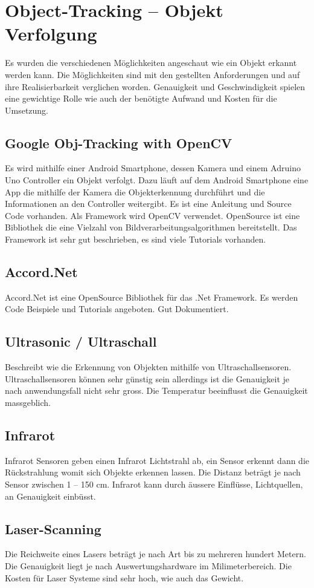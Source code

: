 \section{Object-Tracking – Objekt Verfolgung}
Es wurden die verschiedenen Möglichkeiten angeschaut wie ein Objekt erkannt werden kann. Die Möglichkeiten sind mit den gestellten Anforderungen und auf ihre Realisierbarkeit verglichen worden. Genauigkeit und Geschwindigkeit spielen eine gewichtige Rolle wie auch der benötigte Aufwand und Kosten für die Umsetzung.

\subsection{Google Obj-Tracking with OpenCV}
Es wird mithilfe einer Android Smartphone, dessen Kamera und einem Adruino Uno Controller ein Objekt verfolgt. Dazu läuft auf dem Android Smartphone eine App die mithilfe der Kamera die Objekterkennung durchführt und die Informationen an den Controller weitergibt. Es ist eine Anleitung und Source Code vorhanden. Als Framework wird OpenCV verwendet. OpenSource ist eine Bibliothek die eine Vielzahl von Bildverarbeitungsalgorithmen bereitstellt. Das Framework ist sehr gut beschrieben, es sind viele Tutorials vorhanden.

\subsection{Accord.Net}
Accord.Net ist eine OpenSource Bibliothek für das .Net Framework. Es werden Code Beispiele und Tutorials angeboten. Gut Dokumentiert.

\subsection{Ultrasonic / Ultraschall }
Beschreibt wie die Erkennung von Objekten mithilfe von Ultraschallsensoren. Ultraschallsensoren können sehr günstig sein allerdings ist die Genauigkeit je nach anwendungsfall nicht sehr gross. Die Temperatur beeinflusst die Genauigkeit massgeblich. 

\subsection{Infrarot}
Infrarot Sensoren geben einen Infrarot Lichtstrahl ab, ein Sensor erkennt dann die Rückstrahlung womit sich Objekte erkennen lassen. Die Distanz beträgt je nach Sensor zwischen 1 – 150 cm. Infrarot kann durch äussere Einflüsse, Lichtquellen, an Genauigkeit einbüsst.

\subsection{Laser-Scanning}
Die Reichweite eines Lasers beträgt je nach Art bis zu mehreren hundert Metern. Die Genauigkeit liegt je nach Auswertungshardware im Milimeterbereich. Die Kosten für Laser Systeme sind sehr hoch, wie auch das Gewicht.

